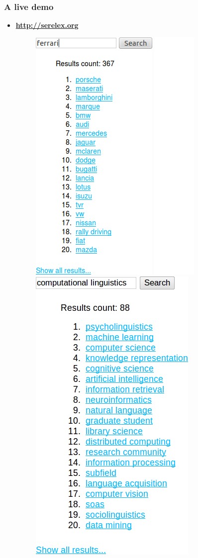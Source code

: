 \begin{frame}
\frametitle{A live demo}

\begin{itemize}
  \item {\bf \url{http://serelex.org} }
  
\begin{figure}  
    \centering
        \includegraphics[height=0.6\textwidth]{figures/serelex}
        \includegraphics[height=0.5\textwidth]{figures/spacer}
        \includegraphics[height=0.6\textwidth]{figures/serelex-2}
        \end{figure}
\end{itemize}
\end{frame}







